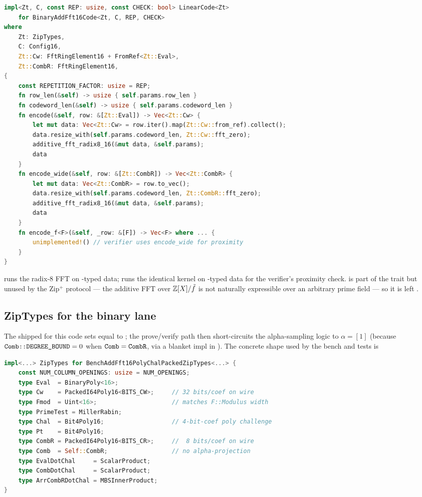 \begin{lstlisting}[language=Rust]
impl<Zt, C, const REP: usize, const CHECK: bool> LinearCode<Zt>
    for BinaryAddFft16Code<Zt, C, REP, CHECK>
where
    Zt: ZipTypes,
    C: Config16,
    Zt::Cw: FftRingElement16 + FromRef<Zt::Eval>,
    Zt::CombR: FftRingElement16,
{
    const REPETITION_FACTOR: usize = REP;
    fn row_len(&self) -> usize { self.params.row_len }
    fn codeword_len(&self) -> usize { self.params.codeword_len }
    fn encode(&self, row: &[Zt::Eval]) -> Vec<Zt::Cw> {
        let mut data: Vec<Zt::Cw> = row.iter().map(Zt::Cw::from_ref).collect();
        data.resize_with(self.params.codeword_len, Zt::Cw::fft_zero);
        additive_fft_radix8_16(&mut data, &self.params);
        data
    }
    fn encode_wide(&self, row: &[Zt::CombR]) -> Vec<Zt::CombR> {
        let mut data: Vec<Zt::CombR> = row.to_vec();
        data.resize_with(self.params.codeword_len, Zt::CombR::fft_zero);
        additive_fft_radix8_16(&mut data, &self.params);
        data
    }
    fn encode_f<F>(&self, _row: &[F]) -> Vec<F> where ... {
        unimplemented!() // verifier uses encode_wide for proximity
    }
}
\end{lstlisting}

 runs the radix-8 FFT on -typed data;
 runs the identical kernel on -typed
data for the verifier's proximity check.  is part of
the  trait but unused by the Zip$^+$ protocol --- the
additive FFT over $\mathbb{Z}[X]/\tilde f$ is not naturally expressible over an
arbitrary prime field --- so it is left .

\subsection{ZipTypes for the binary lane}
\label{sec:zip-types}

The shipped  for this code sets  equal to
; the prove/verify path then short-circuits the
alpha-sampling logic to $\alpha = [1]$ (because
$\texttt{Comb::DEGREE\_BOUND} = 0$ when $\texttt{Comb} = \texttt{CombR}$,
via a  blanket impl in
). The concrete shape used by the
bench and tests is

\begin{lstlisting}[language=Rust]
impl<...> ZipTypes for BenchAddFft16PolyChalPackedZipTypes<...> {
    const NUM_COLUMN_OPENINGS: usize = NUM_OPENINGS;
    type Eval  = BinaryPoly<16>;
    type Cw    = PackedI64Poly16<BITS_CW>;     // 32 bits/coef on wire
    type Fmod  = Uint<16>;                     // matches F::Modulus width
    type PrimeTest = MillerRabin;
    type Chal  = Bit4Poly16;                   // 4-bit-coef poly challenge
    type Pt    = Bit4Poly16;
    type CombR = PackedI64Poly16<BITS_CR>;     //  8 bits/coef on wire
    type Comb  = Self::CombR;                  // no alpha-projection
    type EvalDotChal     = ScalarProduct;
    type CombDotChal     = ScalarProduct;
    type ArrCombRDotChal = MBSInnerProduct;
}
\end{lstlisting}

